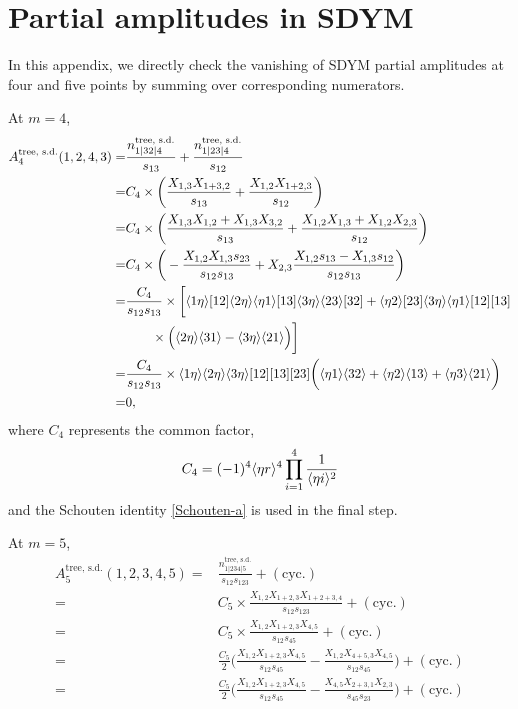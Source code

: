 \documentclass[a4paper,11pt]{article}
\begin{document}
\section{Partial amplitudes in SDYM}\label{SDYM}
In this appendix, we directly check the vanishing of SDYM partial amplitudes at four and five points by summing over corresponding numerators.\par
At $m=4$, 
\begin{equation}
    \begin{split}
    A^{\text{tree, s.d.}}_4(1,2,4,3)=&\frac{n^{\text{tree, s.d.}}_{1|32|4}}{s_{13}}+\frac{n^{\text{tree, s.d.}}_{1|23|4}}{s_{12}}\\
    =&C_4\times\bigg(\frac{X_{1,3}X_{1+3,2}}{s_{13}}+\frac{X_{1,2}X_{1+2,3}}{s_{12}}\bigg)\\
    =&C_4\times\bigg(\frac{X_{1,3}X_{1,2}+X_{1,3}X_{3,2}}{s_{13}}+\frac{X_{1,2}X_{1,3}+X_{1,2}X_{2,3}}{s_{12}}\bigg)\\
    =&C_4\times\bigg(-\frac{X_{1,2}X_{1,3}s_{23}}{s_{12}s_{13}}+X_{2,3}\frac{X_{1,2}s_{13}-X_{1,3}s_{12}}{s_{12}s_{13}}\bigg)\\
    =&\frac{C_4}{s_{12}s_{13}}\times\bigg[\langle 1\eta  \rangle[12]\langle 2\eta \rangle\langle \eta 1 \rangle[13]\langle 3\eta \rangle\langle 23 \rangle[32]+
    \langle \eta 2 \rangle[23]\langle 3\eta \rangle\langle \eta 1 \rangle[12][13]\\
    &\qquad\times\Big(\langle 2\eta \rangle\langle 31 \rangle-\langle 3\eta \rangle\langle 21 \rangle\Big)\bigg]\\
    =&\frac{C_4}{s_{12}s_{13}}\times \langle 1\eta \rangle\langle 2\eta \rangle\langle 3\eta \rangle[12][13][23]\bigg(\langle \eta 1 \rangle\langle 32 \rangle+\langle \eta 2 \rangle\langle 13 \rangle+\langle \eta 3 \rangle\langle 21 \rangle\bigg)\\
    =&0,
    \end{split}
\end{equation}
where $C_4$ represents the common factor,
\begin{equation*}
    C_4=(-1)^4\langle \eta r \rangle^4\prod_{i=1}^4\frac{1}{\langle \eta i \rangle^2}
\end{equation*} and the Schouten identity \eqref{Schouten-a} is used in the final step.\par
At $m=5$,
\begin{equation}\label{a5-s1}
    \begin{split}
    A^{\text{tree, s.d.}}_5(1,2,3,4,5)=&\frac{n^{\text{tree, s.d.}}_{1|234|5}}{s_{12} s_{123}}+(\text{cyc.})\\
    =&C_5\times\frac{X_{1,2}X_{1+2,3}X_{1+2+3,4}}{s_{12}s_{123}}+(\text{cyc.})\\
    =&C_5\times\frac{X_{1,2}X_{1+2,3}X_{4,5}}{s_{12}s_{45}}+(\text{cyc.})\\
    =&\frac{C_5}{2}\Bigg(\frac{X_{1,2}X_{1+2,3}X_{4,5}}{s_{12}s_{45}}-\frac{X_{1,2}X_{4+5,3}X_{4,5}}{s_{12}s_{45}}\Bigg)+(\text{cyc.})\\
    =&\frac{C_5}{2}\Bigg(\frac{X_{1,2}X_{1+2,3}X_{4,5}}{s_{12}s_{45}}-\frac{X_{4,5}X_{2+3,1}X_{2,3}}{s_{45}s_{23}}\Bigg)+(\text{cyc.})
    \end{split}
\end{equation}
\end{document}
